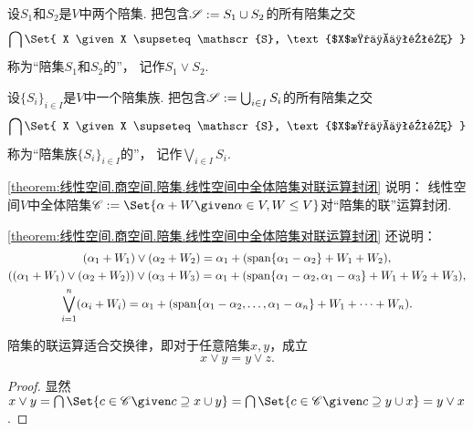 \begin{definition}
设\(S_1\)和\(S_2\)是\(V\)中两个陪集.
把包含\(\mathscr{S} := S_1 \cup S_2\)的所有陪集之交\begin{equation*}
	\bigcap\Set{
		X
		\given
		X \supseteq \mathscr{S},
		\text{$X$是一个陪集}
	}
\end{equation*}
称为“陪集\(S_1\)和\(S_2\)的”，
记作\(S_1 \vee S_2\).
\end{definition}

\begin{definition}
设\(\{S_i\}_{i \in I}\)是\(V\)中一个陪集族.
把包含\(\mathscr{S} := \bigcup_{i \in I} S_i\)的所有陪集之交\begin{equation*}
	\bigcap\Set{
		X
		\given
		X \supseteq \mathscr{S},
		\text{$X$是一个陪集}
	}
\end{equation*}
称为“陪集族\(\{S_i\}_{i \in I}\)的”，
记作\(\bigvee_{i \in I} S_i\).
\end{definition}

\cref{theorem:线性空间.商空间.陪集.线性空间中全体陪集对联运算封闭} 说明：
线性空间\(V\)中全体陪集\(
	\mathscr{C}
	\defeq
	\Set{
		\alpha + W
		\given
		\alpha \in V,
		W \leq V
	}
\)对“陪集的联”运算封闭.

\cref{theorem:线性空间.商空间.陪集.线性空间中全体陪集对联运算封闭} 还说明：\begin{gather*}
	(\alpha_1 + W_1) \vee (\alpha_2 + W_2)
	= \alpha_1 + (\operatorname{span}\{\alpha_1 - \alpha_2\} + W_1 + W_2), \\
	((\alpha_1 + W_1) \vee (\alpha_2 + W_2)) \vee (\alpha_3 + W_3)
	= \alpha_1 + (\operatorname{span}\{\alpha_1 - \alpha_2,\alpha_1 - \alpha_3\} + W_1 + W_2 + W_3), \\
	\bigvee_{i=1}^n (\alpha_i + W_i)
	= \alpha_1 + (\operatorname{span}\{\alpha_1 - \alpha_2,\dotsc,\alpha_1 - \alpha_n\} + W_1 + \dotsb + W_n).
\end{gather*}

\begin{property}
陪集的联运算适合交换律，即对于任意陪集\(x,y\)，成立\begin{equation}
	x \vee y = y \vee z.
\end{equation}
\begin{proof}
显然\(
	x \vee y
	= \bigcap\Set{
		c \in \mathscr{C}
		\given
		c \supseteq x \cup y
	}
	= \bigcap\Set{
		c \in \mathscr{C}
		\given
		c \supseteq y \cup x
	}
	= y \vee x
\).
\end{proof}
\end{property}

